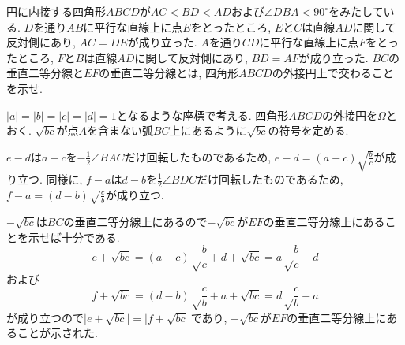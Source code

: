 \begin{bprb}[ISL2024-G1]
円に内接する四角形$ABCD$が$AC<BD<AD$および$\angle DBA<90^\circ$をみたしている.
$D$を通り$AB$に平行な直線上に点$E$をとったところ, $E$と$C$は直線$AD$に関して反対側にあり, $AC=DE$が成り立った.
$A$を通り$CD$に平行な直線上に点$F$をとったところ, $F$と$B$は直線$AD$に関して反対側にあり, $BD=AF$が成り立った.
$BC$の垂直二等分線と$EF$の垂直二等分線とは, 四角形$ABCD$の外接円上で交わることを示せ.
\end{bprb}
\begin{ifsol*}
$\lvert a\rvert=\lvert b\rvert=\lvert c\rvert=\lvert d\rvert=1$となるような座標で考える.
四角形$ABCD$の外接円を$\Omega$とおく.
$\sqrt{bc}$が点$A$を含まない弧$BC$上にあるように$\sqrt{bc}$の符号を定める.

$e-d$は$a-c$を$-\frac 12\angle BAC$だけ回転したものであるため, $e-d=(a-c)\sqrt{\frac bc}$が成り立つ.
同様に, $f-a$は$d-b$を$\frac 12\angle BDC$だけ回転したものであるため, $f-a=(d-b)\sqrt{\frac cb}$が成り立つ.

$-\sqrt{bc}$は$BC$の垂直二等分線上にあるので$-\sqrt{bc}$が$EF$の垂直二等分線上にあることを示せば十分である.
\[e+\sqrt{bc}=(a-c)\sqrt\frac bc+d+\sqrt{bc}=a\sqrt\frac bc+d\]
および
\[f+\sqrt{bc}=(d-b)\sqrt\frac cb+a+\sqrt{bc}=d\sqrt\frac cb+a\]
が成り立つので$\lvert e+\sqrt{bc}\rvert=\lvert f+\sqrt{bc}\rvert$であり, $-\sqrt{bc}$が$EF$の垂直二等分線上にあることが示された.
\end{ifsol*}